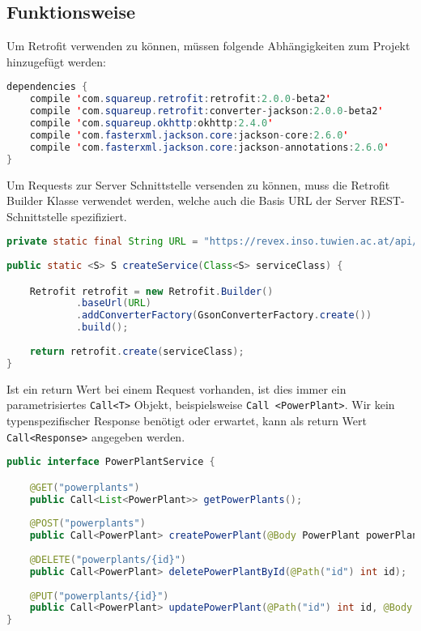 \subsection{Funktionsweise}
Um Retrofit verwenden zu können, müssen folgende Abhängigkeiten zum Projekt hinzugefügt werden:

\begin{lstlisting}[language=java, label=dependenciesRetrofit, numbers=none, frame=single]
dependencies {
	compile 'com.squareup.retrofit:retrofit:2.0.0-beta2'
	compile 'com.squareup.retrofit:converter-jackson:2.0.0-beta2'
	compile 'com.squareup.okhttp:okhttp:2.4.0'
	compile 'com.fasterxml.jackson.core:jackson-core:2.6.0'
	compile 'com.fasterxml.jackson.core:jackson-annotations:2.6.0'
}
\end{lstlisting}

Um Requests zur Server Schnittstelle versenden zu können, muss die Retrofit Builder Klasse verwendet werden, welche auch die Basis URL der Server REST-Schnittstelle spezifiziert.

\begin{lstlisting}[language=java, caption={Retrofit Builder},label=retrofitBuilder, frame=single, stringstyle=\color{mymauve}\scriptsize]
private static final String URL = "https://revex.inso.tuwien.ac.at/api/";
 
public static <S> S createService(Class<S> serviceClass) {

	Retrofit retrofit = new Retrofit.Builder()
			.baseUrl(URL)
			.addConverterFactory(GsonConverterFactory.create())
			.build();
	
	return retrofit.create(serviceClass);
}
\end{lstlisting}

Ist ein return Wert bei einem Request vorhanden, ist dies immer ein parametrisiertes \texttt{Call<T>} Objekt, beispielsweise \texttt{Call <PowerPlant>}. Wir kein typenspezifischer Response benötigt oder erwartet, kann als return Wert \texttt{Call<Response>} angegeben werden.
 
\begin{lstlisting}[language=java, caption={Auszug aus dem PowerPlantService},label={lst:retrofitPowerPlantService}, escapechar=|, numbers=none, frame=single]
public interface PowerPlantService {

	@GET("powerplants")
	public Call<List<PowerPlant>> getPowerPlants();
	
	@POST("powerplants")
	public Call<PowerPlant> createPowerPlant(@Body PowerPlant powerPlant);
	
	@DELETE("powerplants/{id}")
	public Call<PowerPlant> deletePowerPlantById(@Path("id") int id); |\label{line:path}|
	
	@PUT("powerplants/{id}")
	public Call<PowerPlant> updatePowerPlant(@Path("id") int id, @Body PowerPlant powerPlant); |\label{line:body}|
}
\end{lstlisting}

